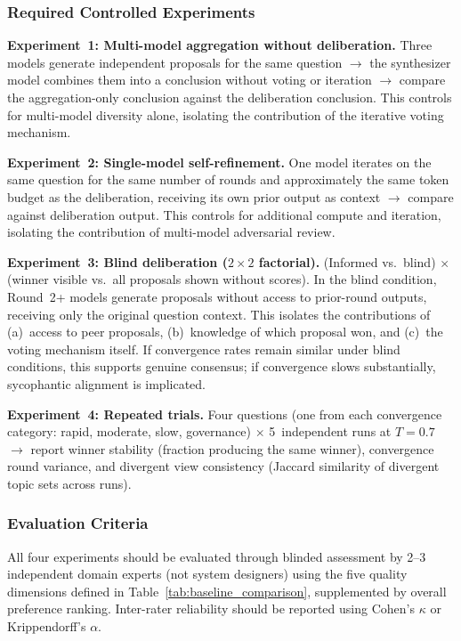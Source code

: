 \documentclass[11pt,a4paper]{article}
\begin{document}
\subsubsection{Required Controlled Experiments}

\textbf{Experiment~1: Multi-model aggregation without deliberation.} Three models generate independent proposals for the same question $\rightarrow$ the synthesizer model combines them into a conclusion without voting or iteration $\rightarrow$ compare the aggregation-only conclusion against the deliberation conclusion. This controls for multi-model diversity alone, isolating the contribution of the iterative voting mechanism.

\textbf{Experiment~2: Single-model self-refinement.} One model iterates on the same question for the same number of rounds and approximately the same token budget as the deliberation, receiving its own prior output as context $\rightarrow$ compare against deliberation output. This controls for additional compute and iteration, isolating the contribution of multi-model adversarial review.

\textbf{Experiment~3: Blind deliberation ($2\times2$ factorial).} (Informed vs.\ blind) $\times$ (winner visible vs.\ all proposals shown without scores). In the blind condition, Round~2+ models generate proposals without access to prior-round outputs, receiving only the original question context. This isolates the contributions of (a)~access to peer proposals, (b)~knowledge of which proposal won, and (c)~the voting mechanism itself. If convergence rates remain similar under blind conditions, this supports genuine consensus; if convergence slows substantially, sycophantic alignment is implicated.

\textbf{Experiment~4: Repeated trials.} Four questions (one from each convergence category: rapid, moderate, slow, governance) $\times$ 5~independent runs at $T=0.7$ $\rightarrow$ report winner stability (fraction producing the same winner), convergence round variance, and divergent view consistency (Jaccard similarity of divergent topic sets across runs).

\subsubsection{Evaluation Criteria}

All four experiments should be evaluated through blinded assessment by 2--3 independent domain experts (not system designers) using the five quality dimensions defined in Table~\ref{tab:baseline_comparison}, supplemented by overall preference ranking. Inter-rater reliability should be reported using Cohen's $\kappa$ or Krippendorff's $\alpha$.
\end{document}

